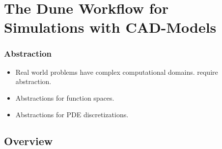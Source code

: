 \section{The Dune Workflow for Simulations with CAD-Models}\label{Sec:Workflow}

\begin{frame}
  \frametitle<presentation>{Abstraction}
  \begin{itemize}
    \item Real world problems have complex computational domains.
      require abstraction.
    \item Abstractions for function spaces.
    \item Abstractions for PDE discretizations.
  \end{itemize}
\end{frame}

\subsection{Overview}

